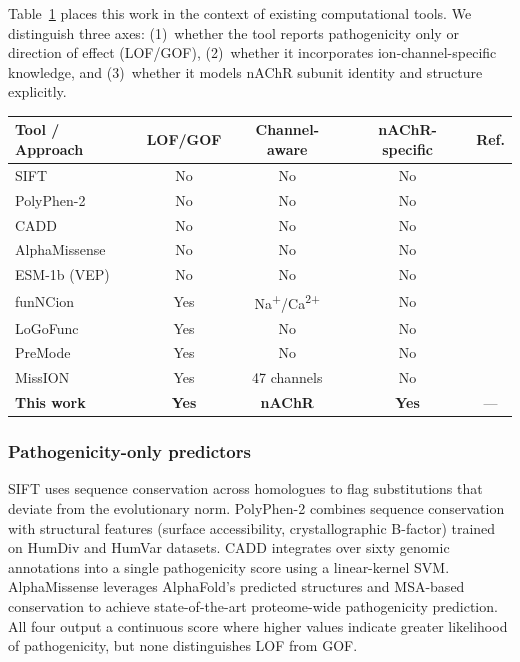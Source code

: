 \documentclass{ws-procs11x85}
\begin{document}
Table~\ref{tab:tools} places this work in the context of existing
computational tools. We distinguish three axes: (1)~whether the tool
reports pathogenicity only or direction of effect (LOF/GOF),
(2)~whether it incorporates ion-channel-specific knowledge, and
(3)~whether it models nAChR subunit identity and structure explicitly.

\begin{table}[ht]
{\begin{tabular}{@{}lcccc@{}}
\toprule
Tool / Approach & LOF/GOF & Channel-aware & nAChR-specific & Ref. \\
\midrule
SIFT                  & No  & No  & No  & \cite{sift} \\
PolyPhen-2            & No  & No  & No  & \cite{polyphen2} \\
CADD                  & No  & No  & No  & \cite{cadd} \\
AlphaMissense         & No  & No  & No  & \cite{alphamissense} \\
ESM-1b (VEP)          & No  & No  & No  & \cite{esm1b} \\
\midrule
funNCion              & Yes & Na\textsuperscript{+}/Ca\textsuperscript{2+} & No  & \cite{funncion} \\
LoGoFunc              & Yes & No          & No  & \cite{logofunc} \\
PreMode               & Yes & No          & No  & \cite{premode} \\
MissION               & Yes & 47 channels & No  & \cite{mission} \\
\midrule
\textbf{This work}    & \textbf{Yes} & \textbf{nAChR} & \textbf{Yes} & --- \\
\bottomrule
\end{tabular}}
\label{tab:tools}
\end{table}

\subsubsection{Pathogenicity-only predictors}

SIFT \cite{sift} uses sequence conservation across homologues to
flag substitutions that deviate from the evolutionary norm.
PolyPhen-2 \cite{polyphen2} combines sequence conservation with
structural features (surface accessibility, crystallographic B-factor)
trained on HumDiv and HumVar datasets. CADD \cite{cadd} integrates
over sixty genomic annotations into a single pathogenicity score using
a linear-kernel SVM. AlphaMissense \cite{alphamissense} leverages
AlphaFold's predicted structures and MSA-based conservation to achieve
state-of-the-art proteome-wide pathogenicity prediction. All four
output a continuous score where higher values indicate greater
likelihood of pathogenicity, but none distinguishes LOF from GOF.
\end{document}
